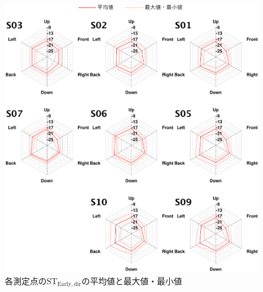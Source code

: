 \documentclass[11pt,a4j]{jreport}
\begin{document}
\newpage
{}
\begin{figure}[htbp]
  \centering
  \includegraphics[scale=.8]{images/realHallDirSt/realHallOverall/eachPointEarly.pdf}
  \caption{各測定点の$\mathrm{ST_{Early,dir}}$の平均値と最大値・最小値}
  \label{fig:各測定位置のSTEarlyの平均値と最大値・最小値}
\end{figure}

\end{document}
